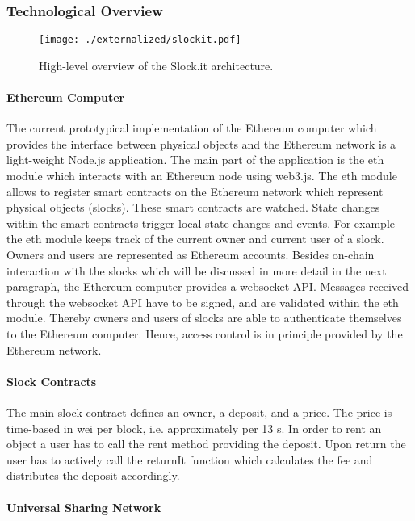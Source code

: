 \subsubsection{Technological Overview}

\begin{figure}
\centering
\texttt{[image: ./externalized/slockit.pdf]}
\caption{High-level overview of the Slock.it architecture. }
\label{fig:21marketplace}
\end{figure}


\paragraph{Ethereum Computer}

The current prototypical implementation of the Ethereum computer which provides the interface between physical objects and the Ethereum network is a light-weight Node.js application. The main part of the application is the eth module which interacts with an Ethereum node using web3.js. The eth module allows to register smart contracts on the Ethereum network which represent physical objects (slocks). These smart contracts are watched. State changes within the smart contracts trigger local state changes and events.
For example the eth module keeps track of the current owner and current user of a slock. Owners and users are represented as Ethereum accounts. Besides on-chain interaction with the slocks which will be discussed in more detail in the next paragraph, the Ethereum computer provides a websocket API. Messages received through the websocket API have to be signed, and are validated within the eth module. Thereby owners and users of slocks are able to authenticate themselves to the Ethereum computer. Hence, access control is in principle provided by the Ethereum network.

\paragraph{Slock Contracts}

The main slock contract defines an owner, a deposit, and a price. The price is time-based in wei per block, i.e. approximately per 13 s. In order to rent an object a user has to call the rent method providing the deposit. Upon return the user has to actively call the returnIt function which calculates the fee and distributes the deposit accordingly. 

\paragraph{Universal Sharing Network}

